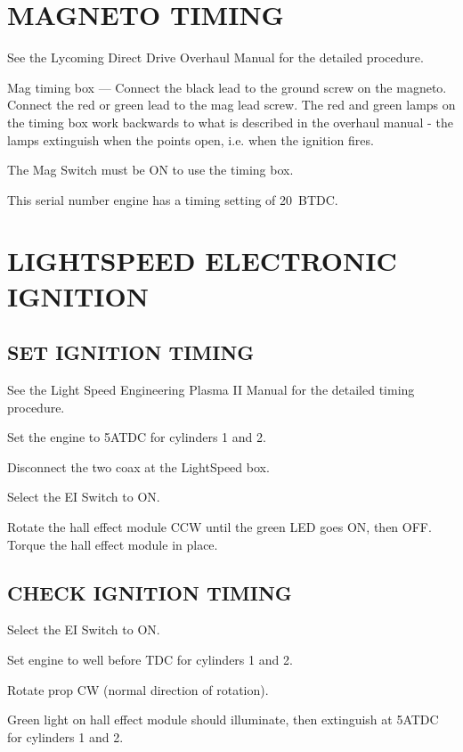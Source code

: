 {}{\section{MAGNETO TIMING} 
\begin{enumerate*}
	\item See the Lycoming Direct Drive Overhaul Manual for the detailed procedure. 
	\item Mag timing box --- Connect the black lead to the ground screw on the magneto. Connect the red or green lead to the mag lead screw. The red and green lamps on the timing box work backwards to what is described in the overhaul manual - the lamps extinguish when the points open, i.e. when the ignition fires. 
	\item The Mag Switch must be ON to use the timing box. 
	\item This serial number engine has a timing setting of 20\textdegree ~BTDC. 	
\end{enumerate*}}

\section{LIGHTSPEED ELECTRONIC IGNITION}
\subsection{SET IGNITION TIMING} 
\begin{enumerate*}
	\item See the Light Speed Engineering Plasma II Manual for the detailed timing procedure. 
	\item Set the engine to 5\textdegree ATDC for cylinders 1 and 2.
	\item Disconnect the two coax at the LightSpeed box.
	\item Select the EI Switch to ON.
	\item Rotate the hall effect module CCW until the green LED goes ON, then OFF. Torque the hall effect module in place.
\end{enumerate*}
\subsection{CHECK IGNITION TIMING} 
\begin{enumerate*}
	\item Select the EI Switch to ON.
	\item Set engine to well before TDC for cylinders 1 and 2.
	\item Rotate prop CW (normal direction of rotation).
	\item Green light on hall effect module should illuminate, then extinguish at 5\textdegree ATDC for cylinders 1 and 2.
\end{enumerate*}

